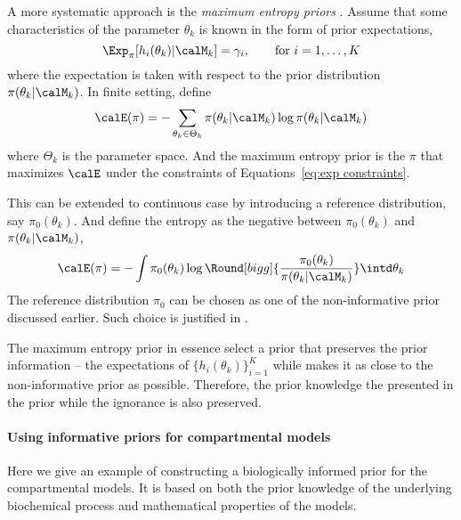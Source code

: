 A more systematic approach is the \emph{maximum entropy priors}
\cite{Jaynes:1989vx}. Assume that some characteristics of the parameter
$\theta_k$ is known in the form of prior expectations,
\begin{equation}
  \Exp_{\pi}[h_i(\theta_k)|\calM_k] = \gamma_i, \qquad\text{for } i =
  1,\dots,K
  \label{eq:exp constraints}
\end{equation}
where the expectation is taken with respect to the prior distribution
$\pi(\theta_k|\calM_k)$. In finite setting, define
\begin{equation}
  \calE(\pi) = -\sum_{\theta_k\in\Theta_k}
  \pi(\theta_k|\calM_k)\log \pi (\theta_k|\calM_k)
\end{equation}
where $\Theta_k$ is the parameter space. And the maximum entropy prior is the
$\pi$ that maximizes $\calE$ under the constraints of Equations~\eqref{eq:exp
  constraints}.

This can be extended to continuous case by introducing a reference
distribution, say $\pi_0(\theta_k)$. And define the entropy as the negative
\kld between $\pi_0(\theta_k)$ and $\pi(\theta_k|\calM_k)$,
\begin{equation}
  \calE(\pi) = -\int \pi_0(\theta_k)\log\Round[bigg]{
    \frac{\pi_0(\theta_k)}{\pi(\theta_k|\calM_k)}}\intd\theta_k
\end{equation}
The reference distribution $\pi_0$ can be chosen as one of the non-informative
prior discussed earlier. Such choice is justified in
\cite[][chap.~9]{Robert:2007tc}.

The maximum entropy prior in essence select a prior that preserves the prior
information -- the expectations of $\{h_i(\theta_k)\}_{i=1}^K$ while makes
it as close to the non-informative prior as possible. Therefore, the prior
knowledge the presented in the prior while the ignorance is also preserved.

\paragraph{Using informative priors for \pet compartmental models}

Here we give an example of constructing a biologically informed prior for the
\pet compartmental models. It is based on both the prior knowledge of the
underlying biochemical process and mathematical properties of the models.


